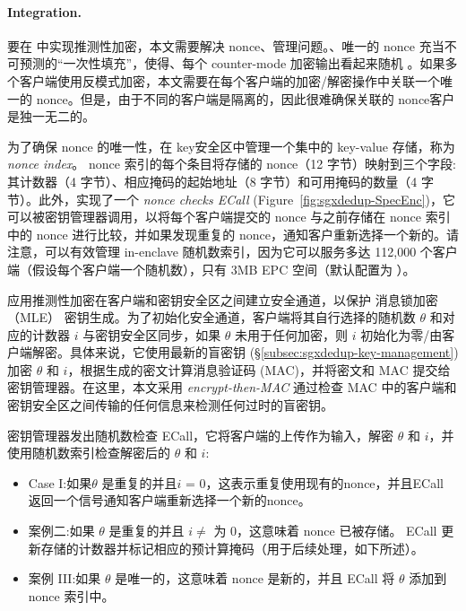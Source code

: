 \paragraph*{Integration.} 要在 \sysnameS 中实现推测性加密，本文需要解决 nonce、管理问题。、唯一的 nonce 充当不可预测的“一次性填充”，使得、每个 counter-mode 加密输出看起来随机 \cite{counter}。如果多个客户端使用反模式加密，本文需要在每个客户端的加密/解密操作中关联一个唯一的 nonce。但是，由于不同的客户端是隔离的，因此很难确保关联的 nonce客户是独一无二的。

为了确保 nonce 的唯一性，\sysnameS 在 key安全区中管理一个集中的 key-value 存储，称为 \textit{ nonce index}。 nonce 索引的每个条目将存储的 nonce（12 字节）映射到三个字段:其计数器（4 字节）、相应掩码的起始地址（8 字节）和可用掩码的数量（4 字节）。此外，\sysnameS 实现了一个 \textit{ nonce checks ECall} (Figure~\ref{fig:sgxdedup-SpecEnc})，它可以被密钥管理器调用，以将每个客户端提交的 nonce 与之前存储在 nonce 索引中的 nonce 进行比较，并如果发现重复的 nonce，通知客户重新选择一个新的。请注意，可以有效管理 in-enclave 随机数索引，因为它可以服务多达 112,000 个客户端（假设每个客户端一个随机数），只有 3MB EPC 空间（默认配置为 \sysnameS）。

\sysnameS 应用推测性加密在客户端和密钥安全区之间建立安全通道，以保护 消息锁加密（MLE） 密钥生成。为了初始化安全通道，客户端将其自行选择的随机数 $\theta$ 和对应的计数器 $i$ 与密钥安全区同步，如果 $\theta$ 未用于任何加密，则 $i$ 初始化为零/由客户端解密。具体来说，它使用最新的盲密钥 (\S\ref{subsec:sgxdedup-key-management}) 加密 $\theta$ 和 $i$，根据生成的密文计算消息验证码 (MAC)，并将密文和 MAC 提交给密钥管理器。在这里，本文采用 \textit{ encrypt-then-MAC} \cite{bellare2000Authenticated} 通过检查 MAC 中的客户端和密钥安全区之间传输的任何信息来检测任何过时的盲密钥。

密钥管理器发出随机数检查 ECall，它将客户端的上传作为输入，解密 $\theta$ 和 $i$，并使用随机数索引检查解密后的 $\theta$ 和 $i$:
%
\begin{itemize}[leftmargin=*]
\item Case I:如果$\theta$ 是重复的并且$i$ = 0，这表示重复使用现有的nonce，并且ECall 返回一个信号通知客户端重新选择一个新的nonce。
\item 案例二:如果 $\theta$ 是重复的并且 $i \neq$ 为 0，这意味着 nonce 已被存储。 ECall 更新存储的计数器并标记相应的预计算掩码（用于后续处理，如下所述）。
\item 案例 III:如果 $\theta$ 是唯一的，这意味着 nonce 是新的，并且 ECall 将 $\theta$ 添加到 nonce 索引中。
\end{itemize}

